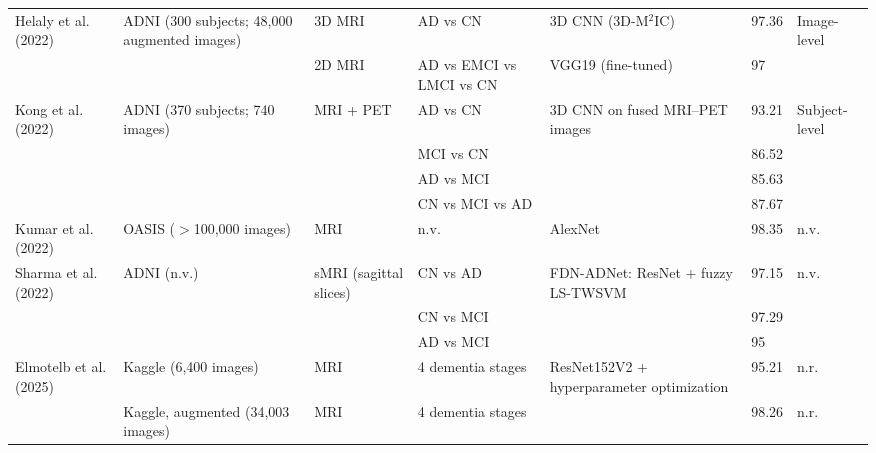 \begin{table}[t]
\begin{tabular}{L{2.0cm} L{3.1cm} L{1.4cm} L{2.3cm} L{3.7cm} L{0.9cm} L{2.0cm}}
    Helaly et al. (2022) & ADNI (300 subjects; 48,000 augmented images) & 3D MRI & AD vs CN & 3D CNN (3D-M$^2$IC) & 97.36 & Image-level \\
     & & 2D MRI & AD vs EMCI vs LMCI vs CN & VGG19 (fine-tuned) & 97 & \\
    \addlinespace[2pt]
    Kong et al. (2022) & ADNI (370 subjects; 740 images) & MRI + PET & AD vs CN & 3D CNN on fused MRI--PET images & 93.21 & Subject-level \\
     & & & MCI vs CN & & 86.52 & \\
     & & & AD vs MCI & & 85.63 & \\
     & & & CN vs MCI vs AD & & 87.67 & \\
    \addlinespace[2pt]
    Kumar et al. (2022) & OASIS ($>$100,000 images) & MRI & n.v. & AlexNet & 98.35 & n.v. \\
    \addlinespace[2pt]
    Sharma et al. (2022) & ADNI (n.v.) & sMRI (sagittal slices) & CN vs AD & FDN-ADNet: ResNet + fuzzy LS-TWSVM & 97.15 & n.v. \\
     & & & CN vs MCI & & 97.29 & \\
     & & & AD vs MCI & & 95 & \\
    \addlinespace[2pt]
    Elmotelb et al. (2025) & Kaggle (6,400 images) & MRI & 4 dementia stages & ResNet152V2 + hyperparameter optimization & 95.21 & n.r. \\
     & Kaggle, augmented (34,003 images) & MRI & 4 dementia stages & & 98.26 & n.r. \\
    \bottomrule
  \end{tabular}
\end{table}
